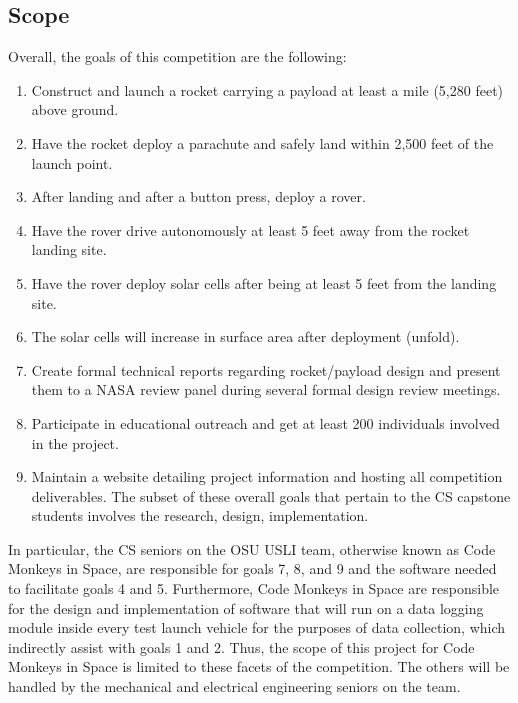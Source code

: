\documentclass[onecolumn, draftclsnofoot,10pt, compsoc]{IEEEtran}
\begin{document}
\subsection{Scope}
Overall, the goals of this competition are the following:
\begin{enumerate}
\item Construct and launch a rocket carrying a payload at least a mile (5,280 feet) above ground.
\item Have the rocket deploy a parachute and safely land within 2,500 feet of the launch point.
\item After landing and after a button press, deploy a rover.
\item Have the rover drive autonomously at least 5 feet away from the rocket landing site.
\item Have the rover deploy solar cells after being at least 5 feet from the landing site.
\item The solar cells will increase in surface area after deployment (unfold).
\item Create formal technical reports regarding rocket/payload design and present them to a NASA review panel
during several formal design review meetings.
\item Participate in educational outreach and get at least 200 individuals involved in the project.
\item Maintain a website detailing project information and hosting all competition deliverables.
The subset of these overall goals that pertain to the CS capstone students involves the research, design, implementation.
\end{enumerate}
In particular, the CS seniors on the OSU USLI team, otherwise known as Code Monkeys in Space, are responsible for goals 7, 8, and 9 and the software needed to facilitate goals 4 and 5. Furthermore, Code Monkeys in Space are responsible for the design and implementation of software that will run on a data logging module inside every test launch vehicle for the purposes of data collection, which indirectly assist with goals 1 and 2. Thus, the scope of this project for Code Monkeys in Space is limited to these facets of the competition. The others will be handled by the mechanical and electrical engineering seniors on the team.
\end{document}
